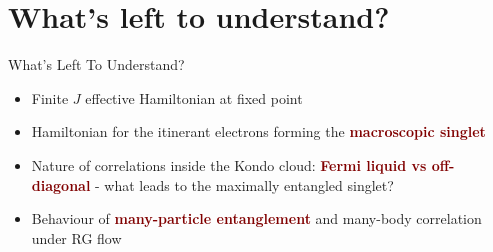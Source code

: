 \documentclass[aspectratio=169]{beamer}
\newcommand{\focus}[1]{\textcolor{maroon}{\textbf{#1}}}
\begin{document}
\section{What's left to understand?}
\begin{frame}[noframenumbering]{What's Left To Understand?}
  
\begin{itemize}[<+-|alert@+>]
	\item Finite \(J\) effective Hamiltonian at fixed point
	\vspace*{20pt}
	\item Hamiltonian for the itinerant electrons forming the \focus{macroscopic singlet}
	\vspace*{20pt}
	\item Nature of correlations inside the Kondo cloud: \focus{Fermi liquid vs off-diagonal} - what leads to the maximally entangled singlet?
	\vspace*{20pt}
	\item Behaviour of \focus{many-particle entanglement} and many-body correlation under RG flow
\end{itemize}

\end{frame}
\end{document}
